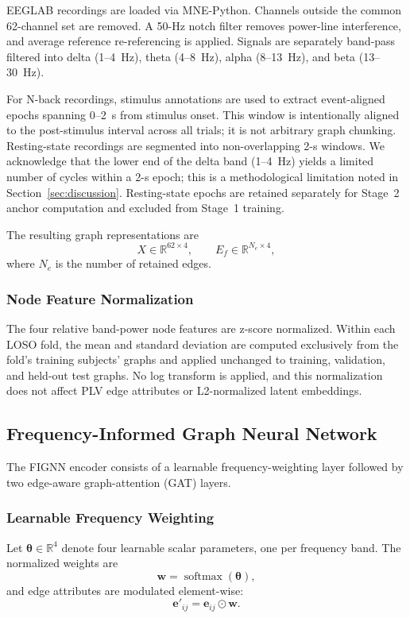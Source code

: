 \documentclass{ieeeaccess}
\begin{document}
EEGLAB recordings are loaded via MNE-Python. Channels outside the common
62-channel set are removed. A 50-Hz notch filter removes power-line
interference, and average reference re-referencing is applied. Signals are
separately band-pass filtered into delta (1--4~Hz), theta (4--8~Hz), alpha
(8--13~Hz), and beta (13--30~Hz).

For N-back recordings, stimulus annotations are used to extract event-aligned
epochs spanning 0--2~s from stimulus onset. This window is intentionally
aligned to the post-stimulus interval across all trials; it is not arbitrary
graph chunking. Resting-state recordings are segmented into non-overlapping
2-s windows. We acknowledge that the lower end of the delta band (1--4~Hz)
yields a limited number of cycles within a 2-s epoch; this is a methodological
limitation noted in Section~\ref{sec:discussion}. Resting-state epochs are
retained separately for Stage~2 anchor computation and excluded from
Stage~1 training.

The resulting graph representations are
\begin{equation}
  X \in \mathbb{R}^{62 \times 4}, \qquad
  E_f \in \mathbb{R}^{N_e \times 4},
\end{equation}
where $N_e$ is the number of retained edges.

\subsubsection{Node Feature Normalization}
The four relative band-power node features are z-score normalized. Within
each LOSO fold, the mean and standard deviation are computed exclusively from
the fold's training subjects' graphs and applied unchanged to training,
validation, and held-out test graphs. No log transform is applied, and this
normalization does not affect PLV edge attributes or L2-normalized latent
embeddings.

\subsection{Frequency-Informed Graph Neural Network}

The FIGNN encoder consists of a learnable frequency-weighting layer followed
by two edge-aware graph-attention (GAT) layers.

\subsubsection{Learnable Frequency Weighting}
Let $\boldsymbol{\theta} \in \mathbb{R}^{4}$ denote four learnable scalar
parameters, one per frequency band. The normalized weights are
\begin{equation}
  \mathbf{w} = \operatorname{softmax}(\boldsymbol{\theta}),
\end{equation}
and edge attributes are modulated element-wise:
\begin{equation}
  \mathbf{e}'_{ij} = \mathbf{e}_{ij} \odot \mathbf{w}.
\end{equation}
\end{document}
